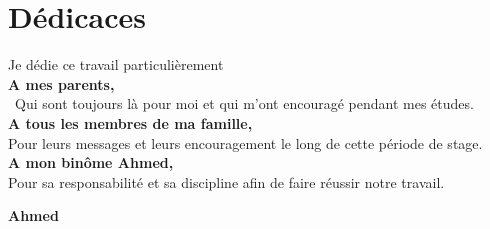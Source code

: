 \chapter*{Dédicaces }

\begin{center}
	
	\begin{minipage}[c]{1\columnwidth}
		
		{\large 
			\vskip1cm
			
			\centering
			Je dédie ce travail particulièrement \\\vskip0.5cm\textbf{A mes parents,}\\\ Qui sont toujours là pour moi et qui m'ont encouragé pendant mes études.\\ \vskip0.5cm
			\textbf{A tous les membres de ma famille,}\\Pour leurs messages et leurs encouragement le long de cette période de stage.\\ \vskip0.5cm
			\textbf{A mon binôme Ahmed,}\\
			Pour sa responsabilité et sa discipline afin de faire réussir notre travail.
		}
		
		
	\end{minipage}
	
\end{center}

\vskip1.5cm
\begin{flushright}\LARGE
	\bf{Ahmed}
\end{flushright}
